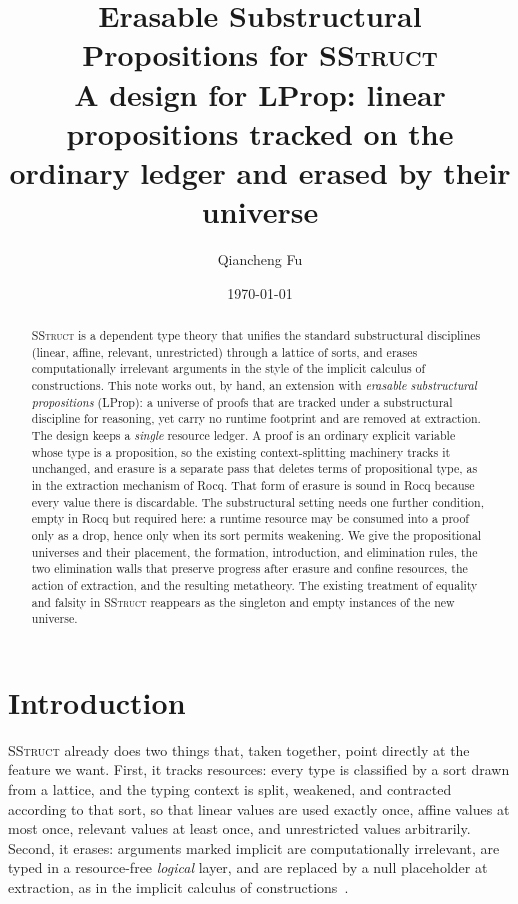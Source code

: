 \documentclass[11pt]{article}
\title{\textbf{Erasable Substructural Propositions for \textsc{SStruct}}\\[2pt]
\large A design for \textsf{LProp}: linear propositions tracked on the ordinary
ledger and erased by their universe}
\author{Qiancheng Fu}
\date{\today}
\theoremstyle{definition}
\theoremstyle{plain}
\begin{document}
\maketitle

\begin{abstract}
\textsc{SStruct} is a dependent type theory that unifies the standard
substructural disciplines (linear, affine, relevant, unrestricted) through a
lattice of sorts, and erases computationally irrelevant arguments in the style
of the implicit calculus of constructions. This note works out, by hand, an
extension with \emph{erasable substructural propositions} (\textsf{LProp}): a
universe of proofs that are tracked under a substructural discipline for
reasoning, yet carry no runtime footprint and are removed at extraction. The
design keeps a \emph{single} resource ledger. A proof is an ordinary explicit
variable whose type is a proposition, so the existing context-splitting machinery
tracks it unchanged, and erasure is a separate pass that deletes terms of
propositional type, as in the extraction mechanism of Rocq. That form of erasure
is sound in Rocq because every value there is discardable. The substructural
setting needs one further condition, empty in Rocq but required here: a runtime
resource may be consumed into a proof only as a drop, hence only when its sort
permits weakening. We give the propositional universes and their placement, the
formation, introduction, and elimination rules, the two elimination walls that
preserve progress after erasure and confine resources, the action of extraction,
and the resulting metatheory. The existing treatment of equality and falsity in
\textsc{SStruct} reappears as the singleton and empty instances of the new
universe.
\end{abstract}

\tableofcontents

\section{Introduction}

\textsc{SStruct} already does two things that, taken together, point directly at
the feature we want. First, it tracks resources: every type is classified by a
sort drawn from a lattice, and the typing context is split, weakened, and
contracted according to that sort, so that linear values are used exactly once,
affine values at most once, relevant values at least once, and unrestricted
values arbitrarily. Second, it erases: arguments marked implicit are
computationally irrelevant, are typed in a resource-free \emph{logical} layer,
and are replaced by a null placeholder at extraction, as in the
implicit calculus of constructions~\cite{iccstar}.
\end{document}
